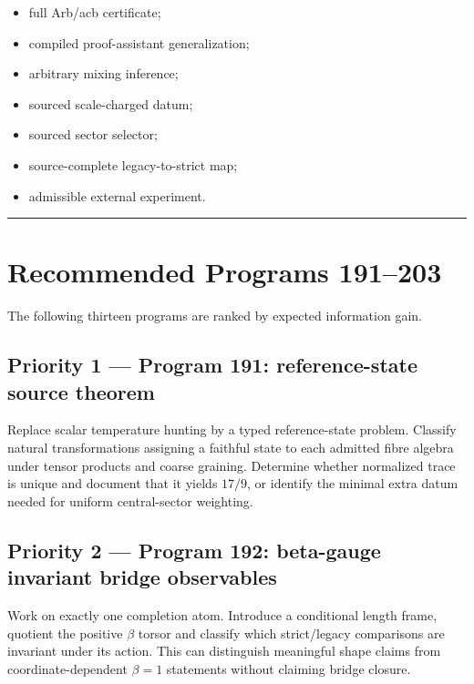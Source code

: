 \documentclass[11pt,a4paper,openany]{report}
\begin{document}
\begin{itemize}
\item 
full Arb/\allowbreak{}acb certificate;

\item 
compiled proof-assistant generalization;

\item 
arbitrary mixing inference;

\item 
sourced scale-charged datum;

\item 
sourced sector selector;

\item 
source-complete legacy-to-strict map;

\item 
admissible external experiment.

\end{itemize}

\par\medskip\hrule\medskip

\chapter{Recommended Programs 191--203}

The following thirteen programs are ranked by expected information gain.

\section{Priority 1 --- Program 191: reference-state source theorem}

Replace scalar temperature hunting by a typed reference-state problem. Classify natural transformations assigning a faithful state to each admitted fibre algebra under tensor products and coarse graining. Determine whether normalized trace is unique and document that it yields \(17/9\), or identify the minimal extra datum needed for uniform central-sector weighting.

\section{Priority 2 --- Program 192: beta-gauge invariant bridge observables}

Work on exactly one completion atom. Introduce a conditional length frame, quotient the positive \(\beta\) torsor and classify which strict/\allowbreak{}legacy comparisons are invariant under its action. This can distinguish meaningful shape claims from coordinate-dependent \(\beta=1\) statements without claiming bridge closure.
\end{document}
